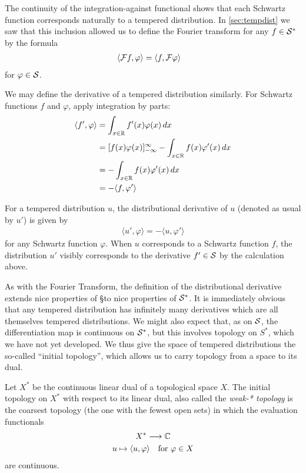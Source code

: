   The continuity of the integration-against functional shows that each Schwartz function corresponds naturally to a tempered distribution.
  In \cref{sec:tempdist} we saw that this inclusion allowed us to define the Fourier transform for any $f\in\S^*$ by the formula
  \begin{align*}
    \langle\F f, \varphi\rangle &= \langle f, \F\varphi\rangle
  \end{align*}
  for $\varphi\in\S$.
  
  We may define the derivative of a tempered distribution similarly.
  For Schwartz functions $f$ and $\varphi$, apply integration by parts:
  \begin{align*}
    \langle f', \varphi\rangle
    &= \int_{x\in\R} f'(x)\varphi(x)\,dx
    \\&= [f(x)\varphi(x)]_{-\infty}^\infty -\int_{x\in\R} f(x)\varphi'(x)\,dx
    \\&= -\int_{x\in\R} f(x)\varphi'(x)\,dx
    \\&= -\langle f,\varphi'\rangle
  \end{align*}
  \begin{defn}
    For a tempered distribution $u$, the distributional derivative of $u$ (denoted as usual by $u'$) is given by
    \begin{align*}
      \langle u', \varphi\rangle = -\langle u, \varphi'\rangle
    \end{align*}
    for any Schwartz function $\varphi$.
    When $u$ corresponds to a Schwartz function $f$, the distribution $u'$ visibly corresponds to the derivative $f'\in\S$ by the calculation above. 
  \end{defn}
  
  As with the Fourier Transform, the definition of the distributional derivative extends nice properties of \S to nice properties of $\S^*$.
  It is immediately obvious that any tempered distribution has infinitely many derivatives which are all themselves tempered distributions.
  We might also expect that, as on $\S$, the differentiation map is continuous on $\S^*$, but this involves topology on $S^*$, which we have not yet developed.
  We thus give the space of tempered distributions the so-called ``initial topology'', which allows us to carry topology from a space to its dual.
  \begin{defn}
    Let $X^*$ be the continuous linear dual of a topological space $X$.
    The initial topology on $X^*$ with respect to its linear dual, also called the \emph{weak-* topology} is the coarsest topology (the one with the fewest open sets) in which the evaluation functionals
    \begin{gather*}
      X^*\longrightarrow\C\\
      u\mapsto \langle u,\varphi\rangle\quad\text{for }\varphi\in X
    \end{gather*}
    are continuous.
  \end{defn}

